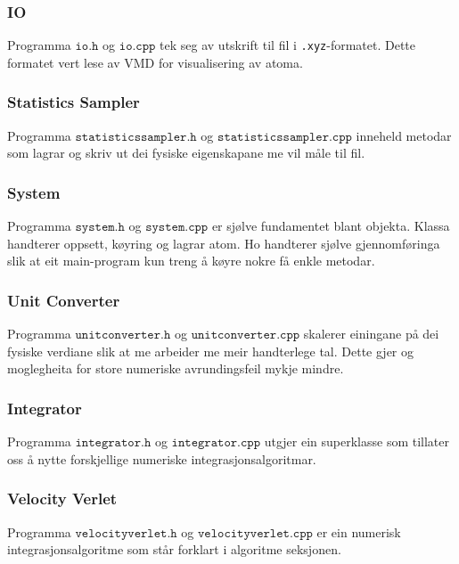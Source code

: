 \documentclass[12pt, a4paper]{article}
\theoremstyle{definition}
\begin{document}
        \subsubsection*{IO}
            Programma $\texttt{io.h}$ og $\texttt{io.cpp}$ tek seg av utskrift til fil i \verb!.xyz!-formatet. Dette formatet vert lese av VMD for visualisering av atoma.

        \subsubsection*{Statistics Sampler}
            Programma $\texttt{statisticssampler.h}$ og $\texttt{statisticssampler.cpp}$ inneheld metodar som lagrar og skriv ut dei fysiske eigenskapane me vil måle til fil.

        \subsubsection*{System}
            Programma $\texttt{system.h}$ og $\texttt{system.cpp}$ er sjølve fundamentet blant objekta. Klassa handterer oppsett, køyring og lagrar atom. Ho handterer 
            sjølve gjennomføringa slik at eit main-program kun treng å køyre nokre få enkle metodar.

        \subsubsection*{Unit Converter}
            Programma $\texttt{unitconverter.h}$ og $\texttt{unitconverter.cpp}$ skalerer einingane på dei fysiske verdiane slik at me arbeider me meir handterlege tal.
            Dette gjer og moglegheita for store numeriske avrundingsfeil mykje mindre.

        \subsubsection*{Integrator}
            Programma $\texttt{integrator.h}$ og $\texttt{integrator.cpp}$ utgjer ein superklasse som tillater oss å nytte forskjellige numeriske integrasjonsalgoritmar.

        \subsubsection*{Velocity Verlet}
            Programma $\texttt{velocityverlet.h}$ og $\texttt{velocityverlet.cpp}$ er ein numerisk integrasjonsalgoritme som står forklart i algoritme seksjonen.
\end{document}
